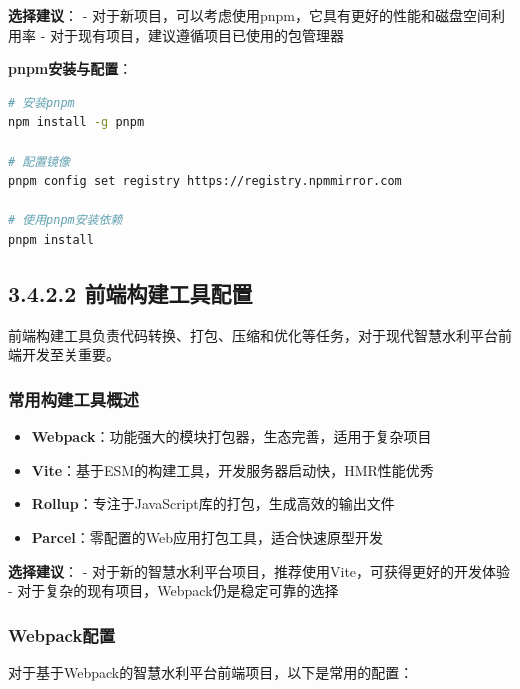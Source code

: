 \textbf{选择建议}： -
对于新项目，可以考虑使用pnpm，它具有更好的性能和磁盘空间利用率 -
对于现有项目，建议遵循项目已使用的包管理器

\textbf{pnpm安装与配置}：

\begin{lstlisting}[language=bash]
# 安装pnpm
npm install -g pnpm

# 配置镜像
pnpm config set registry https://registry.npmmirror.com

# 使用pnpm安装依赖
pnpm install
\end{lstlisting}

\subsection{3.4.2.2
前端构建工具配置}\label{ux524dux7aefux6784ux5efaux5de5ux5177ux914dux7f6e}

前端构建工具负责代码转换、打包、压缩和优化等任务，对于现代智慧水利平台前端开发至关重要。

\subsubsection{常用构建工具概述}\label{ux5e38ux7528ux6784ux5efaux5de5ux5177ux6982ux8ff0}

\begin{itemize}
\tightlist
\item
  \textbf{Webpack}：功能强大的模块打包器，生态完善，适用于复杂项目
\item
  \textbf{Vite}：基于ESM的构建工具，开发服务器启动快，HMR性能优秀
\item
  \textbf{Rollup}：专注于JavaScript库的打包，生成高效的输出文件
\item
  \textbf{Parcel}：零配置的Web应用打包工具，适合快速原型开发
\end{itemize}

\textbf{选择建议}： -
对于新的智慧水利平台项目，推荐使用Vite，可获得更好的开发体验 -
对于复杂的现有项目，Webpack仍是稳定可靠的选择

\subsubsection{Webpack配置}\label{webpackux914dux7f6e}

对于基于Webpack的智慧水利平台前端项目，以下是常用的配置：

